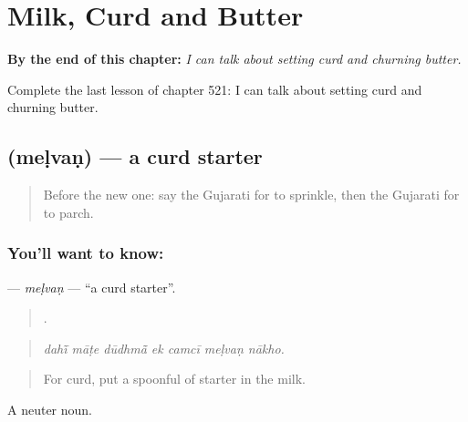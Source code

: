 
\chapter{Milk, Curd and Butter}
\label{ch:gu-milk-curd-and-butter}

\begin{chapteropening}
\textbf{By the end of this chapter:} \emph{I can talk about setting curd and churning butter.}

Complete the last lesson of chapter 521: I can talk about setting curd and churning butter.
\end{chapteropening}

\section[\texorpdfstring{\gu{મેળવણ} (meḷvaṇ)}{મેળવણ (meḷvaṇ)}]{ (meḷvaṇ) — a curd starter}

\label{lesson:GU-C521-melvan}



\begin{quote}
Before the new one: say the Gujarati for to sprinkle, then the Gujarati for to parch.
\end{quote}

\subsection*{You'll want to know: }
\textbf{} — \emph{meḷvaṇ} — \textquotedblleft{}a curd starter\textquotedblright{}.

\begin{quote}
      .
\end{quote}

\begin{quote}
\emph{dahī̃ māṭe dūdhmā̃ ek camcī meḷvaṇ nākho.}
\end{quote}

\begin{quote}
For curd, put a spoonful of starter in the milk.
\end{quote}

A neuter noun.


